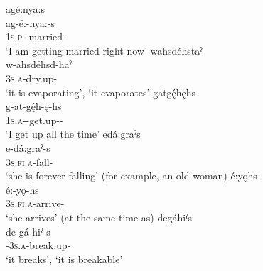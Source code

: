 \ea\label{ex:habitstataspectex}
\ea agé:nya:s\\ 
\gll ag-é:-nya:-s\\
 \textsc{1s.p}-{\joinerE}-married-{\habitual}\\
\glt `I am getting married right now'
\ex wahsdéhstaˀ \\
\gll w-ahsdéhsd-haˀ\\
 \textsc{3s.a}-dry.up-{\habitual}\\
\glt ‘it is evaporating’, `it evaporates'
\ex gatgę́hęhs\\
\gll g-at-gę́h-ę-hs\\
 \textsc{1s.a}-{\semireflexive}-get.up-{\joinerA}-{\habitual}\\
\glt `I get up all the time'
\ex edá:graˀs \\
\gll e-dá:graˀ-s\\
\textsc{3s.fi.a}-fall-{\habitual}\\
\glt ‘she is forever falling’ (for example, an old woman) 
\ex é:yǫhs \\
\gll é:-yǫ-hs\\
\textsc{3s.fi.a}-arrive-{\habitual}\\
\glt ‘she arrives’ (at the same time as) 
\ex degáhiˀs \\
\gll de-gá-hiˀ-s\\
 {\dualic}-\textsc{3s.a}-break.up-{\habitual}\\
\glt ‘it breaks’, `it is breakable'
\z
\z

